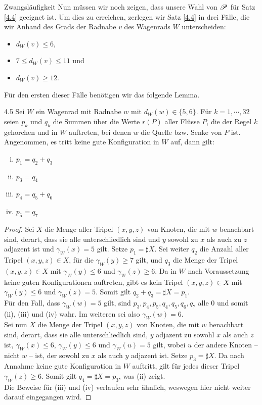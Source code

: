 \begin{section}{Zwangsläufigkeit}
 Nun müssen wir noch zeigen, dass unsere Wahl von $\mathscr{P}$ für Satz \ref{4.4} geeignet ist. Um dies zu erreichen, zerlegen wir Satz \ref{4.4} in drei Fälle, die wir Anhand des Grads der Radnabe $v$ des Wagenrads $W$ unterscheiden:
 \begin{itemize}
  \item $d_W(v) \leq 6$,
  \item $7 \leq d_W(v) \leq 11$ und 
  \item $d_W(v) \geq 12$.
 \end{itemize}
 
 Für den ersten dieser Fälle benötigen wir das folgende Lemma.
 
 \begin{lemmal}{}{4.5}
  Sei $W$ ein Wagenrad mit Radnabe $w$ mit $d_W(w) \in \{5,6\}$. Für $k = 1,\cdots,32$ seien $p_k$ und $q_k$ die Summen über die Werte $r(P)$ aller Flüsse $P$, die der Regel $k$ gehorchen und in $W$ auftreten, bei denen $w$ die Quelle bzw. Senke von $P$ ist. Angenommen, es tritt keine gute Konfiguration in $W$ auf, dann gilt:
  \begin{enumerate}[(i)]
   \item $p_1 = q_2 + q_3$
   \item $p_3 = q_4$
   \item $p_4 = q_5 + q_6$
   \item $p_5 = q_7$
  \end{enumerate}
 \end{lemmal}
 
 \begin{proof}
  Sei $X$ die Menge aller Tripel $(x,y,z)$ von Knoten, die mit $w$ benachbart sind, derart, dass sie alle unterschliedlich sind und $y$ sowohl zu $x$ als auch zu $z$ adjazent ist und $\gamma_W(x) = 5$ gilt. Setze $p_1 = \sharp X$. Sei weiter $q_2$ die Anzahl aller Tripel $(x,y,z) \in X$, für die $\gamma_W(y) \geq 7$ gilt, und $q_3$ die Menge der Tripel $(x,y,z) \in X$ mit $\gamma_W(y) \leq 6$ und $\gamma_W(z) \geq 6$. Da in $W$ nach Voraussetzung keine guten Konfigurationen auftreten, gibt es kein Tripel $(x,y,z) \in X$ mit $\gamma_W(y) \leq 6$ und $\gamma_W(z) = 5$. Somit gilt $q_2 + q_3 = \sharp X = p_1$.\\
  Für den Fall, dass $\gamma_W(w) = 5$ gilt, sind $p_3,p_4,p_5,q_4,q_5,q_6,q_7$ alle 0 und somit (ii), (iii) und (iv) wahr. Im weiteren sei also $\gamma_W(w) = 6$.\\
  Sei nun $X$ die Menge der Tripel $(x,y,z)$ von Knoten, die mit $w$ benachbart sind, derart, dass sie alle unterschliedlich sind, $y$ adjazent zu sowohl $x$ als auch $z$ ist, $\gamma_W(x) \leq 6$, $\gamma_W(y) \leq 6$ und $\gamma_W(u) = 5$ gilt, wobei $u$ der andere Knoten -- nicht $w$ -- ist, der sowohl zu $x$ als auch $y$ adjazent ist. Setze $p_3 = \sharp X$. Da nach Annahme keine gute Konfiguration in $W$ auftritt, gilt für jedes dieser Tripel $\gamma_W(z) \geq 6$. Somit gilt $q_4 = \sharp X = p_3$, was (ii) zeigt.\\
  Die Beweise für (iii) und (iv) verlaufen sehr ähnlich, weswegen hier nicht weiter darauf eingegangen wird.
 \end{proof}


\end{section}
